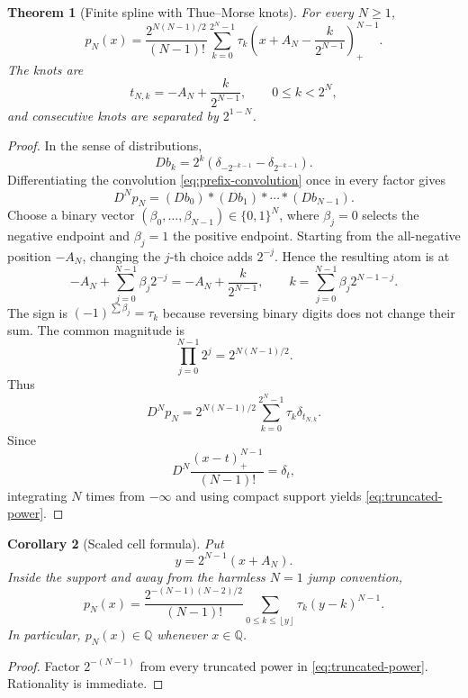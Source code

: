 \documentclass[11pt,oneside]{article}
\numberwithin{equation}{section}
\newtheorem{theorem}{Theorem}[section]
\newtheorem{corollary}[theorem]{Corollary}
\theoremstyle{definition}
\theoremstyle{remark}
\newcommand{\Q}{\mathbb{Q}}
\newcommand{\floor}[1]{\left\lfloor #1\right\rfloor}
\newcommand{\TM}{\tau}
\begin{document}
\begin{theorem}[Finite spline with Thue--Morse knots]
For every $N\ge1$,
\begin{equation}
 \boxed{\displaystyle
 p_N(x)=\frac{2^{N(N-1)/2}}{(N-1)!}
 \sum_{k=0}^{2^N-1}\TM_k
 \left(x+A_N-\frac{k}{2^{N-1}}\right)_+^{N-1}.}
 \label{eq:truncated-power}
\end{equation}
The knots are
\begin{equation}
 t_{N,k}=-A_N+\frac{k}{2^{N-1}},
 \qquad 0\le k<2^N,
 \label{eq:knots}
\end{equation}
and consecutive knots are separated by $2^{1-N}$.
\end{theorem}

\begin{proof}
In the sense of distributions,
\[
 Db_k=2^k\left(\delta_{-2^{-k-1}}-\delta_{2^{-k-1}}\right).
\]
Differentiating the convolution \eqref{eq:prefix-convolution} once in every
factor gives
\[
 D^Np_N=(Db_0)*(Db_1)*\cdots*(Db_{N-1}).
\]
Choose a binary vector $(\beta_0,\ldots,\beta_{N-1})\in\{0,1\}^N$, where
$\beta_j=0$ selects the negative endpoint and $\beta_j=1$ the positive endpoint.
Starting from the all-negative position $-A_N$, changing the $j$-th choice adds
$2^{-j}$.  Hence the resulting atom is at
\[
 -A_N+\sum_{j=0}^{N-1}\beta_j2^{-j}
 =-A_N+\frac{k}{2^{N-1}},
 \qquad
 k=\sum_{j=0}^{N-1}\beta_j2^{N-1-j}.
\]
The sign is $(-1)^{\sum\beta_j}=\TM_k$ because reversing binary digits does not
change their sum.  The common magnitude is
\[
 \prod_{j=0}^{N-1}2^j=2^{N(N-1)/2}.
\]
Thus
\[
 D^Np_N=2^{N(N-1)/2}
 \sum_{k=0}^{2^N-1}\TM_k\delta_{t_{N,k}}.
\]
Since
\[
 D^N\frac{(x-t)_+^{N-1}}{(N-1)!}=\delta_t,
\]
integrating $N$ times from $-\infty$ and using compact support yields
\eqref{eq:truncated-power}.
\end{proof}

\begin{corollary}[Scaled cell formula]
Put
\begin{equation}
 y=2^{N-1}(x+A_N).
 \label{eq:scaled-y}
\end{equation}
Inside the support and away from the harmless $N=1$ jump convention,
\begin{equation}
 p_N(x)=\frac{2^{-(N-1)(N-2)/2}}{(N-1)!}
 \sum_{0\le k\le\floor y}\TM_k(y-k)^{N-1}.
 \label{eq:scaled-cell-formula}
\end{equation}
In particular, $p_N(x)\in\Q$ whenever $x\in\Q$.
\end{corollary}

\begin{proof}
Factor $2^{-(N-1)}$ from every truncated power in
\eqref{eq:truncated-power}.  Rationality is immediate.
\end{proof}
\end{document}
